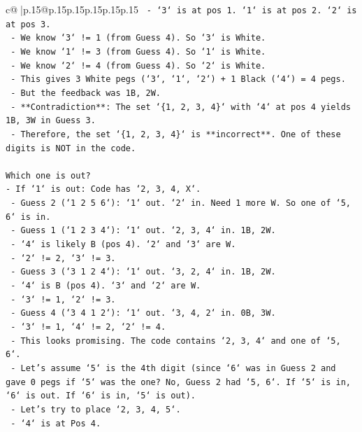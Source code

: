 \documentclass{article}
\begin{document}
{\begin{supertabular}{c@{$\;$}|p{.15\linewidth}@{}p{.15\linewidth}p{.15\linewidth}p{.15\linewidth}p{.15\linewidth}p{.15\linewidth}}
{{{\texttt{    {-} `3` is at pos 1. `1` is at pos 2. `2` is at pos 3.} \\
\texttt{    {-} We know `3` != 1 (from Guess 4). So `3` is White.} \\
\texttt{    {-} We know `1` != 3 (from Guess 4). So `1` is White.} \\
\texttt{    {-} We know `2` != 4 (from Guess 4). So `2` is White.} \\
\texttt{    {-} This gives 3 White pegs (`3`, `1`, `2`) + 1 Black (`4`) = 4 pegs.} \\
\texttt{    {-} But the feedback was 1B, 2W.} \\
\texttt{    {-} **Contradiction**: The set `\{1, 2, 3, 4\}` with `4` at pos 4 yields 1B, 3W in Guess 3.} \\
\texttt{    {-} Therefore, the set `\{1, 2, 3, 4\}` is **incorrect**. One of these digits is NOT in the code.} \\
\\ 
\texttt{Which one is out?} \\
\texttt{{-} If `1` is out: Code has `2, 3, 4, X`.} \\
\texttt{    {-} Guess 2 (`1 2 5 6`): `1` out. `2` in. Need 1 more W. So one of `5, 6` is in.} \\
\texttt{    {-} Guess 1 (`1 2 3 4`): `1` out. `2, 3, 4` in. 1B, 2W.} \\
\texttt{        {-} `4` is likely B (pos 4). `2` and `3` are W.} \\
\texttt{        {-} `2` != 2, `3` != 3.} \\
\texttt{    {-} Guess 3 (`3 1 2 4`): `1` out. `3, 2, 4` in. 1B, 2W.} \\
\texttt{        {-} `4` is B (pos 4). `3` and `2` are W.} \\
\texttt{        {-} `3` != 1, `2` != 3.} \\
\texttt{    {-} Guess 4 (`3 4 1 2`): `1` out. `3, 4, 2` in. 0B, 3W.} \\
\texttt{        {-} `3` != 1, `4` != 2, `2` != 4.} \\
\texttt{    {-} This looks promising. The code contains `2, 3, 4` and one of `5, 6`.} \\
\texttt{    {-} Let's assume `5` is the 4th digit (since `6` was in Guess 2 and gave 0 pegs if `5` was the one? No, Guess 2 had `5, 6`. If `5` is in, `6` is out. If `6` is in, `5` is out).} \\
\texttt{    {-} Let's try to place `2, 3, 4, 5`.} \\
\texttt{        {-} `4` is at Pos 4.} \\
}}}
\end{supertabular}}
\end{document}

